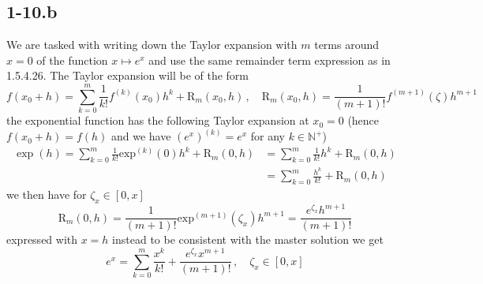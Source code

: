 \documentclass{article}
\begin{document}
\subsection*{1-10.b}
We are tasked with writing down the Taylor expansion with $m$ terms around $x=0$ of the function $x \mapsto e^{x}$ and use the same remainder term expression as in 1.5.4.26. The Taylor expansion will be of the form
\begin{equation*}
    f\left(x_{0} + h\right) = \sum_{k=0}^{m}\frac{1}{k!}f^{\left(k\right)}\left(x_{0}\right)h^{k} + \mathrm{R}_{m}\left(x_{0},h\right)\,,\quad \mathrm{R}_{m}\left(x_{0}, h\right) = \frac{1}{\left(m+1\right)!}f^{\left(m+1\right)}\left(\zeta\right)h^{m+1}
\end{equation*}
the exponential function has the following Taylor expansion at $x_{0} = 0$ (hence $f\left(x_{0} + h\right) = f\left(h\right)$ and we have $\left(e^{x}\right)^{\left(k\right)} = e^{x}$ for any $k \in \mathbb{N}^{+}$)
\begin{align*}
    \exp\left(h\right) = \sum_{k=0}^{m}\frac{1}{k!}\text{exp}^{\left(k\right)}\left(0\right)h^{k} + \mathrm{R}_{m}\left(0,h\right) &= \sum_{k=0}^{m}\frac{1}{k!}h^{k} + \mathrm{R}_{m}\left(0,h\right) \\
    &= \sum_{k=0}^{m}\frac{h^{k}}{k!} + \mathrm{R}_{m}\left(0,h\right)
\end{align*}
we then have for $\zeta_{x} \in \left[0,x\right]$
\begin{equation*}
    \mathrm{R}_{m}\left(0,h\right) = \frac{1}{\left(m+1\right)!}\text{exp}^{\left(m+1\right)}\left(\zeta_{x}\right)h^{m+1} = \frac{e^{\zeta_{x}}h^{m+1}}{\left(m+1\right)!}
\end{equation*}
expressed with $x=h$ instead to be consistent with the master solution we get
\begin{equation*}
    e^{x} = \sum_{k=0}^{m}\frac{x^{k}}{k!} + \frac{e^{\zeta_{x}}x^{m+1}}{\left(m+1\right)!} \,,\quad \zeta_{x} \in \left[0,x\right]
\end{equation*}
\end{document}
